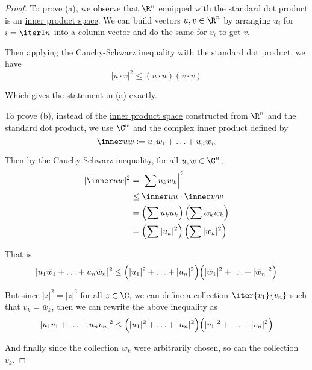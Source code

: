 \begin{proof}
  To prove (a), we observe that $\R^n$ equipped with the standard dot
  product is an \href{b9935c8}{inner product space}. We can build
  vectors $u,v\in\R^n$ by arranging $u_i$ for $i=\iter1n$ into a
  column vector and do the same for $v_i$ to get $v$.

  Then applying the Cauchy-Schwarz inequality with the standard dot product, we
  have
  $$
    |u\cdot v|^2\leq (u\cdot u)(v\cdot v)
  $$

  Which gives the statement in (a) exactly.

  To prove (b), instead of the \href{b9935c8}{inner product space} constructed
  from $\R^n$ and the standard dot product, we use $\C^n$ and the complex inner
  product defined by
  $$
    \inner uw:=u_1\bar w_1+\ldots+u_n\bar w_n
  $$

  Then by the Cauchy-Schwarz inequality, for all $u,w\in\C^n$,
  \begin{align*}
    |\inner uw|^2 &=\left|\sum u_k\bar w_k\right|^2                            \\
                  &\leq\inner uu\cdot\inner ww                                 \\
                  &=\left(\sum u_k\bar u_k\right)\left(\sum w_k\bar w_k\right) \\
                  &=\left(\sum|u_k|^2\right)\left(\sum|w_k|^2\right)
  \end{align*}

  That is
  $$
    |u_1\bar w_1+\ldots+u_n\bar w_n|^2\leq
    \Bigl(|u_1|^2+\ldots+|u_n|^2\Bigr)
    \Bigl(|\bar w_1|^2+\ldots+|\bar w_n|^2\Bigr)
  $$

  But since $|z|^2=|\bar z|^2$ for all $z\in\C$, we can define a collection
  $\iter{v_1}{v_n}$ such that $v_k=\bar w_k$, then we can rewrite the above
  inequality as
  $$
    |u_1v_1+\ldots+u_nv_n|^2\leq
    \Bigl(|u_1|^2+\ldots+|u_n|^2\Bigr)
    \Bigl(|v_1|^2+\ldots+|v_n|^2\Bigr)
  $$

  And finally since the collection $w_k$ were arbitrarily chosen, so can the
  collection $v_k$.
\end{proof}

\label{c980e4c}


